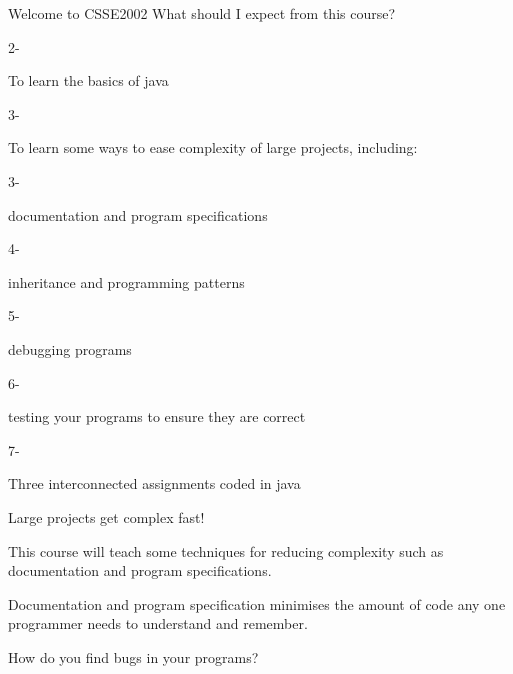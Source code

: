 \documentclass[week2]{csse2002}
\begin{document}
\begin{topic}{Welcome to CSSE2002}
What should I expect from this course?

\begin{itemize}
    \begin{subtopic}{2-}
    \item To learn the basics of java
    \end{subtopic}
    \begin{subtopic}{3-}
    \item To learn some ways to ease complexity of large projects, including:
    \end{subtopic}
    \begin{itemize}
        \begin{subtopic}{3-}
        \item documentation and program specifications
        \end{subtopic}
        \begin{subtopic}{4-}
        \item inheritance and programming patterns
        \end{subtopic}
        \begin{subtopic}{5-}
        \item debugging programs
        \end{subtopic}
        \begin{subtopic}{6-}
        \item testing your programs to ensure they are correct
        \end{subtopic}
    \end{itemize}
    \begin{subtopic}{7-}
    \item Three interconnected assignments coded in java
    \end{subtopic}
\end{itemize}

\begin{subtopic}{3}
Large projects get complex fast!

This course will teach some techniques for reducing complexity such as documentation and program specifications.

Documentation and program specification minimises the amount of code any one programmer needs to understand and remember.
\end{subtopic}

\begin{subtopic}{5}
How do you find bugs in your programs?


\end{subtopic}
\end{topic}
\end{document}
